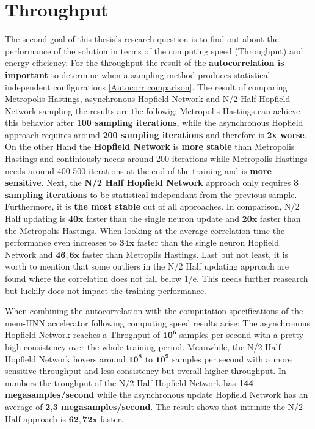 \section{Throughput}

The second goal of this thesis's research question is to find out about the performance of the solution in terms of the 
computing speed (Throughput) and energy efficiency. 
For the throughput the result of the \textbf{autocorrelation is important} to determine when a sampling method produces statistical independent configurations \ref{Autocorr comparison}.
The result of comparing Metropolis Hastings, asynchronous Hopfield Network and N/2 Half Hopfield Network sampling the results are the followig:
Metropolis Hastings can achieve this behavior after \textbf{100 sampling iterations}, while the asynchronous Hopfield approach requires around \textbf{200 sampling iterations} and therefore 
is \textbf{2x worse}. On the other Hand the \textbf{Hopfield Network} is \textbf{more stable} than Metropolis Hastings and continiously needs around 200 iterations 
while Metropolis Hastings needs around 400-500 iterations at the end of the training and is \textbf{more sensitive}. 
Next, the \textbf{N/2 Half Hopfield Network} approach only requires \textbf{3 sampling iterations} to be statistical independant from the previous sample.
Furthermore, it is \textbf{the most stable} out of all approaches. In comparison, N/2 Half updating is \(\mathbf{40x}\) faster than the single neuron
update and \(\mathbf{20x}\) faster than the Metropolis Hastings. 
When looking at the average correlation time the performance even increases to \(\mathbf{34x}\) faster than the single neuron Hopfield Network and \(\mathbf{46,6x}\)
faster than Metroplis Hastings.
Last but not least, it is worth to mention that some outliers in the N/2 Half updating approach are found where 
the correlation does not fall below 1/e. This needs further reasearch but luckily does not impact the training performance. 

When combining the autocorrelation with the computation specifications of the \ac{mem-HNN} accelerator following computing speed results arise:
The asynchronous Hopfield Network reaches a Throghput of \(\mathbf{10^6}\) samples per second with a pretty high
consistency over the whole training period. Meanwhile, the N/2 Half Hopfield Network 
hovers around \(\mathbf{10^8}\) to \(\mathbf{10^9}\) samples per second with a more sensitive throughput and less consistency 
but overall higher throughput.
In numbers the troughput of the N/2 Half Hopfield Network has \textbf{144 megasamples/second} while the asynchronous update Hopfield Network has an average of \textbf{2,3 megasamples/second}.
The result shows that intrinsic the N/2 Half approach is \(\mathbf{62,72x}\) faster. 

